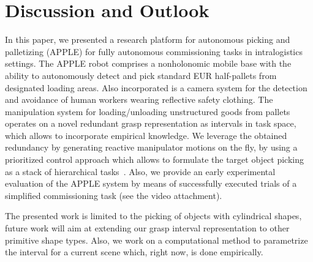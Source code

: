 \section{Discussion and Outlook}
\label{sec:discussion}
%
In this paper, we presented a research platform for autonomous picking and palletizing (APPLE) for
fully autonomous commissioning tasks in intralogistics settings. The APPLE robot comprises a
nonholonomic mobile base with the ability to autonomously detect and pick standard EUR half-pallets
from designated loading areas. Also incorporated is a camera system for the detection and avoidance
of human workers wearing reflective safety clothing. The manipulation system for loading/unloading
unstructured goods from pallets operates on a novel redundant grasp representation as intervals in
task space, which allows to incorporate empirical knowledge. We leverage the obtained redundancy by
generating reactive manipulator motions on the fly, by using a prioritized control approach which
allows to formulate the target object picking as a stack of hierarchical tasks~\cite{Kano11}. Also,
we provide an early experimental evaluation of the APPLE system by means of successfully executed
trials of a simplified commissioning task (see the video attachment).

The presented work is limited to the picking of objects with cylindrical shapes, future work will
aim at extending our grasp interval representation to other primitive shape types. Also, we work on
a computational method to parametrize the interval for a current scene which, right now, is done
empirically. 


